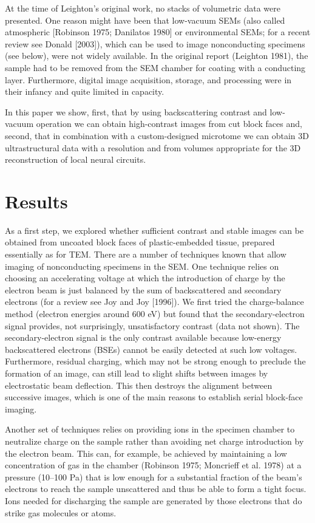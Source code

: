 \documentclass{article}
\begin{document}
At the time of Leighton’s original work, no stacks of volumetric data were presented. One reason might have been that low-vacuum SEMs (also called atmospheric [Robinson 1975; Danilatos 1980] or environmental SEMs; for a recent review see Donald [2003]), which can be used to image nonconducting specimens (see below), were not widely available. In the original report (Leighton 1981), the sample had to be removed from the SEM chamber for coating with a conducting layer. Furthermore, digital image acquisition, storage, and processing were in their infancy and quite limited in capacity.

In this paper we show, first, that by using backscattering contrast and low-vacuum operation we can obtain high-contrast images from cut block faces and, second, that in combination with a custom-designed microtome we can obtain 3D ultrastructural data with a resolution and from volumes appropriate for the 3D reconstruction of local neural circuits.

\section*{Results}

As a first step, we explored whether sufficient contrast and stable images can be obtained from uncoated block faces of plastic-embedded tissue, prepared essentially as for TEM. There are a number of techniques known that allow imaging of nonconducting specimens in the SEM. One technique relies on choosing an accelerating voltage at which the introduction of charge by the electron beam is just balanced by the sum of backscattered and secondary electrons (for a review see Joy and Joy [1996]). We first tried the charge-balance method (electron energies around 600 eV) but found that the secondary-electron signal provides, not surprisingly, unsatisfactory contrast (data not shown). The secondary-electron signal is the only contrast available because low-energy backscattered electrons (BSEs) cannot be easily detected at such low voltages. Furthermore, residual charging, which may not be strong enough to preclude the formation of an image, can still lead to slight shifts between images by electrostatic beam deflection. This then destroys the alignment between successive images, which is one of the main reasons to establish serial block-face imaging.

Another set of techniques relies on providing ions in the specimen chamber to neutralize charge on the sample rather than avoiding net charge introduction by the electron beam. This can, for example, be achieved by maintaining a low concentration of gas in the chamber (Robinson 1975; Moncrieff et al. 1978) at a pressure (10–100 Pa) that is low enough for a substantial fraction of the beam’s electrons to reach the sample unscattered and thus be able to form a tight focus. Ions needed for discharging the sample are generated by those electrons that do strike gas molecules or atoms.
\end{document}
